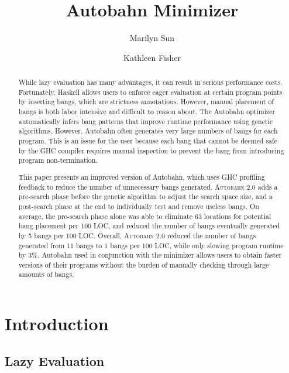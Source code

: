 \documentclass[format=sigplan, review=true]{acmart}
\newcommand{\At}[0]{\textsc{Autobahn 2.0}}
\newcommand{\preopt}[0]{pre-search}
\newcommand{\postopt}[0]{post-search}
\begin{document}
\title{Autobahn Minimizer}
\author{Marilyn Sun}
\author{Kathleen Fisher}
\begin{abstract}
	While lazy evaluation has many advantages, it can result in serious performance costs. Fortunately, Haskell allows users to enforce eager evaluation at certain program points by inserting bangs, which are strictness annotations. However, manual placement of bangs is both labor intensive and difficult to reason about. The Autobahn optimizer automatically infers bang patterns that improve runtime performance using genetic algorithms. However, Autobahn often generates very large numbers of bangs for each program. This is an issue for the user because each bang that cannot be deemed safe by the GHC compiler requires manual inspection to prevent the bang from introducing program non-termination.

This paper presents an improved version of Autobahn, which uses GHC profiling feedback to reduce the number of unnecessary bangs generated. \At{} adds a \preopt{} phase before the genetic algorithm to adjust the search space size, and a \postopt{} phase at the end to individually test and remove useless bangs. On average, the \preopt{} phase alone was able to eliminate 63 locations for potential bang placement per 100 LOC, and reduced the number of bangs eventually generated by 5 bangs per 100 LOC. Overall, \At{} reduced the number of bangs generated from 11 bangs to 1 bangs per 100 LOC, while only slowing program runtime by 3\%. Autobahn used in conjunction with the minimizer allows users to obtain faster versions of their programs without the burden of manually checking through large amounts of bangs.
\end{abstract}
\maketitle

\section{Introduction}

\subsection{Lazy Evaluation}
\end{document}
